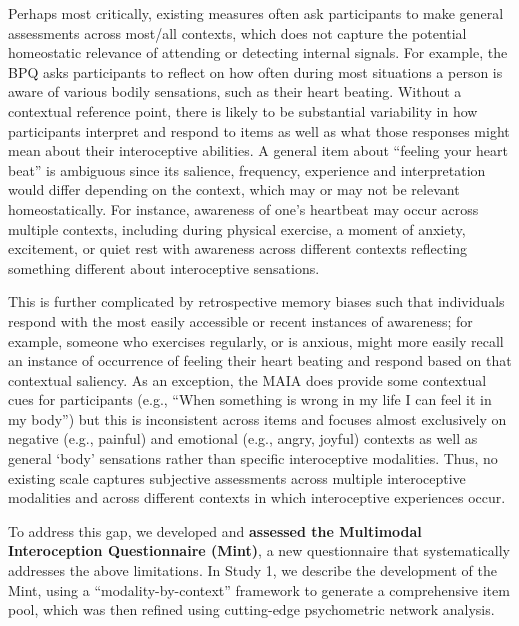 \documentclass[
  man,
  floatsintext,
  longtable,
  nolmodern,
  notxfonts,
  notimes,
  mask,
  colorlinks=true,linkcolor=blue,citecolor=blue,urlcolor=blue]{apa7}
\begin{document}
Perhaps most critically, existing measures often ask participants to
make general assessments across most/all contexts, which does not
capture the potential homeostatic relevance of attending or detecting
internal signals. For example, the BPQ asks participants to reflect on
how often during most situations a person is aware of various bodily
sensations, such as their heart beating. Without a contextual reference
point, there is likely to be substantial variability in how participants
interpret and respond to items as well as what those responses might
mean about their interoceptive abilities. A general item about ``feeling
your heart beat'' is ambiguous since its salience, frequency, experience
and interpretation would differ depending on the context, which may or
may not be relevant homeostatically. For instance, awareness of one's
heartbeat may occur across multiple contexts, including during physical
exercise, a moment of anxiety, excitement, or quiet rest with awareness
across different contexts reflecting something different about
interoceptive sensations.

This is further complicated by retrospective memory biases such that
individuals respond with the most easily accessible or recent instances
of awareness; for example, someone who exercises regularly, or is
anxious, might more easily recall an instance of occurrence of feeling
their heart beating and respond based on that contextual saliency. As an
exception, the MAIA does provide some contextual cues for participants
(e.g., ``When something is wrong in my life I can feel it in my body'')
but this is inconsistent across items and focuses almost exclusively on
negative (e.g., painful) and emotional (e.g., angry, joyful) contexts as
well as general `body' sensations rather than specific interoceptive
modalities. Thus, no existing scale captures subjective assessments
across multiple interoceptive modalities and across different contexts
in which interoceptive experiences occur.

To address this gap, we developed and \textbf{assessed the Multimodal
Interoception Questionnaire (Mint)}, a new questionnaire that
systematically addresses the above limitations. In Study 1, we describe
the development of the Mint, using a ``modality-by-context'' framework
to generate a comprehensive item pool, which was then refined using
cutting-edge psychometric network analysis.
\end{document}
